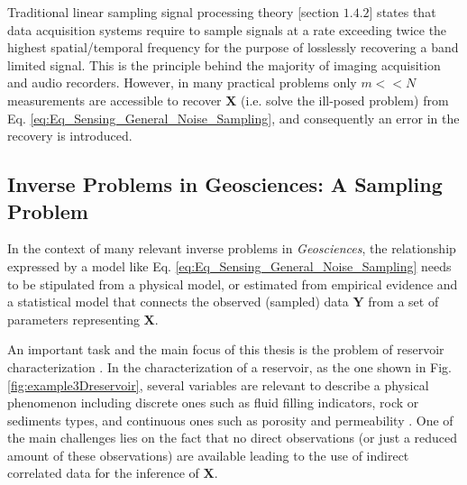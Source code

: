 
Traditional linear sampling signal processing theory \citep{Proakis_1996_a}[section $1.4.2$] states that data acquisition systems require to sample signals at a rate exceeding twice the highest spatial/temporal frequency for the purpose of losslessly recovering a band limited signal. This is the principle behind the majority of imaging acquisition and audio recorders. However, in many practical problems only $m << N$ measurements are accessible to recover $\mathbf{X}$ (i.e. solve the ill-posed problem) from Eq. \eqref{eq:Eq_Sensing_General_Noise_Sampling}, and consequently an error in the recovery is introduced.
















\subsection{Inverse Problems in Geosciences: A Sampling Problem}
\label{secGeoAndInvProblems}

In the context of many relevant inverse problems in \emph{Geosciences}, the relationship expressed by a model like Eq. \eqref{eq:Eq_Sensing_General_Noise_Sampling} needs to be stipulated from a physical model, or estimated from empirical evidence and a statistical model that connects the observed (sampled) data $\mathbf{Y}$ from a set of parameters representing $\mathbf{X}$. 

An important task and the main focus of this thesis is the problem of reservoir characterization \citep{Onwunalu09,kitanidis_1997_a,Strebelle_2004a,Oliver_2008_a}. In the characterization of a reservoir, as the one shown in Fig. \ref{fig:example3Dreservoir}, several variables are relevant to describe a physical phenomenon including discrete ones such as fluid filling indicators, rock or sediments types, and continuous ones such as porosity and permeability \citep{kitanidis_1997_a,Strebelle_2004a,Oliver_2008_a}. One of the main challenges lies on the fact that no direct observations (or just a reduced amount of these observations) are available leading to the use of indirect correlated data for the inference of $\mathbf{X}$.

